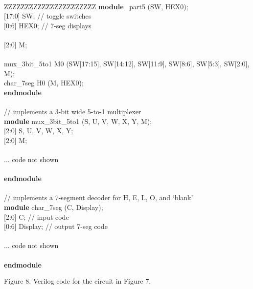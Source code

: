\documentclass[psfig,10pt,fullpage]{article}
\begin{document}
~\\
\begin{center}
\begin{minipage}[t]{12.5 cm}
\begin{tabbing}
ZZ\=ZZ\=ZZ\=ZZ\=ZZ\=ZZ\=ZZ\=ZZ\=ZZ\=ZZ\=ZZ\kill
{\bf module} ~part5 (SW, HEX0);\\
 [17:0] SW;	\>\>\>\>\>\>\>\>// toggle switches\\
 [0:6] HEX0;	\>\>\>\>\>\>\>\>// 7-seg displays\\
~\\
 [2:0] M;\\
~\\
\>mux\_3bit\_5to1 M0 (SW[17:15], SW[14:12], SW[11:9], SW[8:6], SW[5:3], SW[2:0], M);\\
\>char\_7seg H0 (M, HEX0);\\
{\bf endmodule}\\
~\\
// implements a 3-bit wide 5-to-1 multiplexer\\
{\bf module} mux\_3bit\_5to1 (S, U, V, W, X, Y, M);\\
 [2:0] S, U, V, W, X, Y;\\
 [2:0] M;\\
~\\
\>$\ldots$ code not shown\\
~\\
{\bf endmodule}	\\
~\\
// implements a 7-segment decoder for H, E, L, O, and `blank'\\
{\bf module} char\_7seg (C, Display);\\
 [2:0] C;	\>\>\>\>\>\>\>\>// input code\\
 [0:6] Display;	\>\>\>\>\>\>\>\>// output 7-seg code\\
~\\
\>$\ldots$ code not shown\\
~\\
{\bf endmodule}
\end{tabbing}
\end{minipage}
\end{center}

\begin{center}
Figure 8. Verilog code for the circuit in Figure 7.
\end{center}
\end{document}
